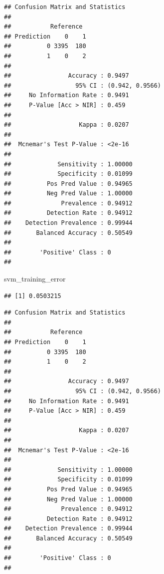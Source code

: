 \documentclass[
]{article}
\newenvironment{Shaded}{\begin{snugshade}}{\end{snugshade}}
\newcommand{\FunctionTok}[1]{\textcolor[rgb]{0.00,0.00,0.00}{#1}}
\newcommand{\NormalTok}[1]{#1}
\newcommand{\SpecialCharTok}[1]{\textcolor[rgb]{0.00,0.00,0.00}{#1}}
\renewcommand{\=}[1]{\stackrel{#1}{=}}
\theoremstyle{definition}
\theoremstyle{remark}
\begin{document}
\begin{verbatim}
## Confusion Matrix and Statistics
## 
##           Reference
## Prediction    0    1
##          0 3395  180
##          1    0    2
##                                          
##                Accuracy : 0.9497         
##                  95% CI : (0.942, 0.9566)
##     No Information Rate : 0.9491         
##     P-Value [Acc > NIR] : 0.459          
##                                          
##                   Kappa : 0.0207         
##                                          
##  Mcnemar's Test P-Value : <2e-16         
##                                          
##             Sensitivity : 1.00000        
##             Specificity : 0.01099        
##          Pos Pred Value : 0.94965        
##          Neg Pred Value : 1.00000        
##              Prevalence : 0.94912        
##          Detection Rate : 0.94912        
##    Detection Prevalence : 0.99944        
##       Balanced Accuracy : 0.50549        
##                                          
##        'Positive' Class : 0              
## 
\end{verbatim}

\begin{Shaded}
\begin{Highlighting}[]
\NormalTok{svm\_training\_error}
\end{Highlighting}
\end{Shaded}

\begin{verbatim}
## [1] 0.0503215
\end{verbatim}

\begin{Shaded}
\end{Shaded}

\begin{verbatim}
## Confusion Matrix and Statistics
## 
##           Reference
## Prediction    0    1
##          0 3395  180
##          1    0    2
##                                          
##                Accuracy : 0.9497         
##                  95% CI : (0.942, 0.9566)
##     No Information Rate : 0.9491         
##     P-Value [Acc > NIR] : 0.459          
##                                          
##                   Kappa : 0.0207         
##                                          
##  Mcnemar's Test P-Value : <2e-16         
##                                          
##             Sensitivity : 1.00000        
##             Specificity : 0.01099        
##          Pos Pred Value : 0.94965        
##          Neg Pred Value : 1.00000        
##              Prevalence : 0.94912        
##          Detection Rate : 0.94912        
##    Detection Prevalence : 0.99944        
##       Balanced Accuracy : 0.50549        
##                                          
##        'Positive' Class : 0              
## 
\end{verbatim}
\end{document}
